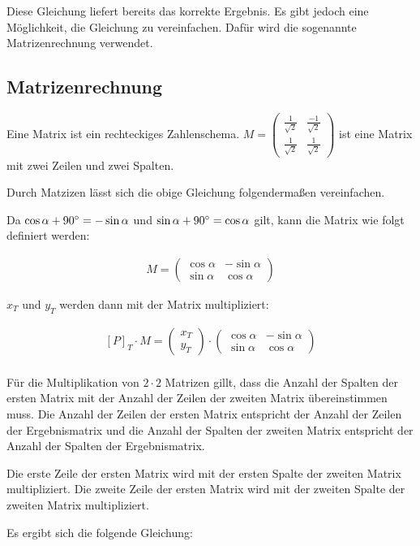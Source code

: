 \documentclass{article}
\newcommand{\m}[1]{\begin{pmatrix}#1\end{pmatrix}}
\begin{document}
    Diese Gleichung liefert bereits das korrekte Ergebnis. Es gibt jedoch eine Möglichkeit, die Gleichung zu vereinfachen.
    Dafür wird die sogenannte Matrizenrechnung verwendet.

    \subsection{Matrizenrechnung}

    Eine Matrix ist ein rechteckiges Zahlenschema.
    $M = \m{\frac{1}{\sqrt{2}} & \frac{-1}{\sqrt{2}} \\ \frac{1}{\sqrt{2}} & \frac{1}{\sqrt{2}}}$ ist eine Matrix
    mit zwei Zeilen und zwei Spalten.

    Durch Matzizen lässt sich die obige Gleichung folgendermaßen vereinfachen.

    Da $\cos \alpha + 90 \degree = - \sin \alpha$ und $\sin \alpha + 90 \degree = \cos \alpha$ gilt,
    kann die Matrix wie folgt definiert werden:

    \[
        \begin{split}
            M = \m{\cos \alpha & - \sin \alpha \\ \sin \alpha & \cos \alpha}
        \end{split}
    \]

    $x_T$ und $y_T$ werden dann mit der Matrix multipliziert:

    \[
        \begin{split}
            {[P]}_{T} \cdot M = \m{x_T \\ y_T} \cdot \m{\cos \alpha & - \sin \alpha \\ \sin \alpha & \cos \alpha} \\
        \end{split}
    \]

    Für die Multiplikation von $2 \cdot 2$ Matrizen gillt, dass die Anzahl der Spalten der ersten Matrix
    mit der Anzahl der Zeilen der zweiten Matrix übereinstimmen muss. Die Anzahl der Zeilen der ersten Matrix
    entspricht der Anzahl der Zeilen der Ergebnismatrix und die Anzahl der Spalten der zweiten Matrix entspricht
    der Anzahl der Spalten der Ergebnismatrix.

    Die erste Zeile der ersten Matrix wird mit der ersten Spalte der zweiten Matrix multipliziert.
    Die zweite Zeile der ersten Matrix wird mit der zweiten Spalte der zweiten Matrix multipliziert.

    Es ergibt sich die folgende Gleichung:
\end{document}
